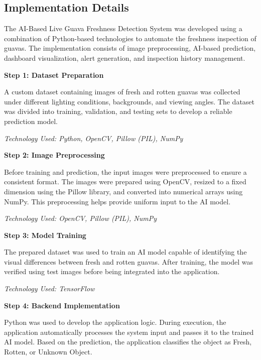 \subsection{Implementation Details}

The AI-Based Live Guava Freshness Detection System was developed using a combination of Python-based technologies to automate the freshness inspection of guavas. The implementation consists of image preprocessing, AI-based prediction, dashboard visualization, alert generation, and inspection history management.

\textbf{Step 1: Dataset Preparation}

A custom dataset containing images of fresh and rotten guavas was collected under different lighting conditions, backgrounds, and viewing angles. The dataset was divided into training, validation, and testing sets to develop a reliable prediction model.

\textit{Technology Used: Python, OpenCV, Pillow (PIL), NumPy}

\vspace{0.3cm}

\textbf{Step 2: Image Preprocessing}

Before training and prediction, the input images were preprocessed to ensure a consistent format. The images were prepared using OpenCV, resized to a fixed dimension using the Pillow library, and converted into numerical arrays using NumPy. This preprocessing helps provide uniform input to the AI model.

\textit{Technology Used: OpenCV, Pillow (PIL), NumPy}

\vspace{0.3cm}

\textbf{Step 3: Model Training}

The prepared dataset was used to train an AI model capable of identifying the visual differences between fresh and rotten guavas. After training, the model was verified using test images before being integrated into the application.

\textit{Technology Used: TensorFlow}

\vspace{0.3cm}

\textbf{Step 4: Backend Implementation}

Python was used to develop the application logic. During execution, the application automatically processes the system input and passes it to the trained AI model. Based on the prediction, the application classifies the object as Fresh, Rotten, or Unknown Object.

